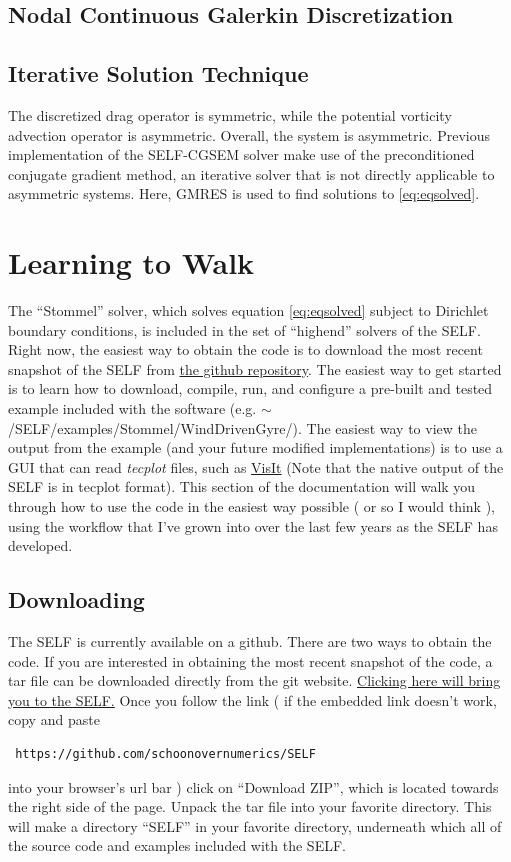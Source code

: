 \documentclass{softwaremanual}
\begin{document}
\section{Nodal Continuous Galerkin Discretization}


\section{Iterative Solution Technique}
The discretized drag operator is symmetric, while the potential vorticity advection operator is asymmetric. Overall, the system is asymmetric. Previous implementation of the SELF-CGSEM solver make use of the preconditioned conjugate gradient method, an iterative solver that is not directly applicable to asymmetric systems. Here, GMRES is used to find solutions to \eqref{eq:eqsolved}.


\chapter{Learning to Walk}
The ``Stommel'' solver, which solves equation \eqref{eq:eqsolved} subject to Dirichlet boundary conditions, is included in the set of ``highend'' solvers of the SELF. Right now, the easiest way to obtain the code is to download the most recent snapshot of the SELF from \href{https://github.com/schoonovernumerics/SELF}{the github repository}. The easiest way to get started is to learn how to download, compile, run, and configure a pre-built and tested example included with the software (e.g. $\sim$/SELF/examples/Stommel/WindDrivenGyre/). The easiest way to view the output from the example (and your future modified implementations) is to use a GUI that can read \textit{tecplot} files, such as \href{https://wci.llnl.gov/simulation/computer-codes/visit/}{VisIt} (Note that the native output of the SELF is in tecplot format). This section of the documentation will walk you through how to use the code in the easiest way possible ( or so I would think ), using the workflow that I've grown into over the last few years as the SELF has developed.


\section{Downloading}
The SELF is currently available on a github. There are two ways to obtain the code. If you are interested in obtaining the most recent snapshot of the code, a tar file can be downloaded directly from the git website.  \href{https://github.com/schoonovernumerics/SELF}{Clicking here will bring you to the SELF.} Once you follow the link ( if the embedded link doesn't work, copy and paste
\begin{verbatim}
 https://github.com/schoonovernumerics/SELF 
\end{verbatim}
into your browser's url bar ) click on ``Download ZIP'', which is located towards the right side of the page. Unpack the tar file into your favorite directory. This will make a directory ``SELF'' in your favorite directory, underneath which all of the source code and examples included with the SELF. 
\end{document}
